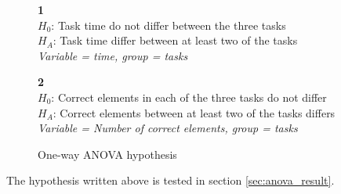 \begin{figure}[H]
	\begin{framed}\centering
		\textbf{1}\\
		$H_{0}$: Task time do not differ between the three tasks\\
		$H_{A}$: Task time differ between at least two of the tasks\\
		\textit{Variable = time, group = tasks}\newline
		
		\textbf{2}\\
		$H_{0}$: Correct elements in each of the three tasks do not differ\\
		$H_{A}$: Correct elements between at least two of the tasks differs \\
		\textit{Variable = Number of correct elements, group = tasks}
		
	\end{framed}
	\caption{One-way ANOVA hypothesis}
	\label{fig:hypothesis_anova}
\end{figure}

The hypothesis written above is tested in section \ref{sec:anova_result}. %




